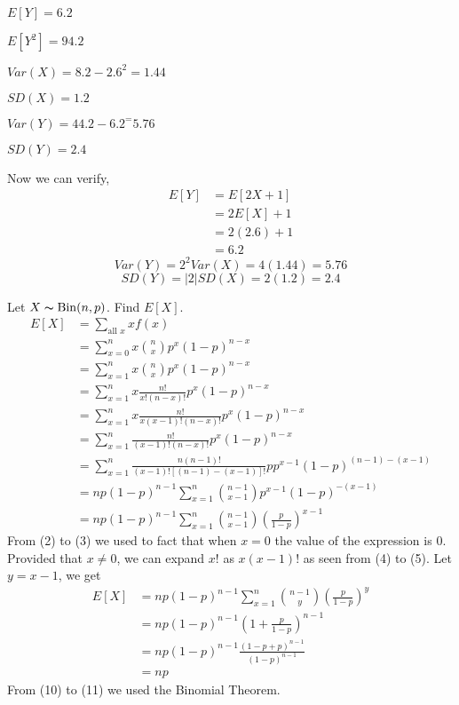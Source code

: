 $ E[Y]=6.2 $

$ E[Y^2]=94.2 $

$ Var(X)=8.2-2.6^2=1.44 $

$ SD(X)=1.2 $

$ Var(Y)=44.2-6.2^=5.76 $

$SD(Y)=2.4$

Now we can verify,
\begin{align*}
    E[Y]&=E[2X+1]\\
    &=2E[X]+1\\
    &=2(2.6)+1\\
    &=6.2
\end{align*}
\[ Var(Y)=2^2 Var(X)=4(1.44)=5.76 \]
\[ SD(Y)=|2|SD(X)=2(1.2)=2.4 \]

Let $ X \thicksim \operatorname{Bin}(n,p) $. Find $ E[X] $.
\setcounter{equation}{0}
\begin{align}
    E[X]&=\sum\limits_{\text{all } x}x f(x)\\
    &=\sum\limits_{x=0}^{n}x \binom{n}{x}p^x(1-p)^{n-x}\\
    &=\sum\limits_{x=1}^{n}x \binom{n}{x}p^x(1-p)^{n-x}\\
    &=\sum\limits_{x=1}^{n}x \frac{n!}{x!(n-x)!}p^x(1-p)^{n-x}\\
    &=\sum\limits_{x=1}^{n}x \frac{n!}{x(x-1)!(n-x)!}p^x(1-p)^{n-x}\\
    &=\sum\limits_{x=1}^{n}\frac{n!}{(x-1)!(n-x)!}p^x(1-p)^{n-x}\\
    &=\sum\limits_{x=1}^{n}\frac{n(n-1)!}{(x-1)![(n-1)-(x-1)]!}pp^{x-1}(1-p)^{(n-1)-(x-1)}\\
    &=np(1-p)^{n-1}\sum\limits_{x=1}^{n}\binom{n-1}{x-1}p^{x-1}(1-p)^{-(x-1)}\\
    &=np(1-p)^{n-1}\sum\limits_{x=1}^{n}\binom{n-1}{x-1}\left(\frac{p}{1-p}\right)^{x-1}
\end{align}
From (2) to (3) we used to fact that when $ x=0 $ the value of the expression 
is $ 0 $. Provided that $ x\neq 0 $, we can expand $ x! $ as $ x(x-1)! $ as
seen from (4) to (5). Let $ y=x-1 $, we get
\begin{align}
    E[X]&=np(1-p)^{n-1}\sum\limits_{x=1}^{n}\binom{n-1}{y}\left(\frac{p}{1-p}\right)^{y}\\
    &=np(1-p)^{n-1}\left(1+\frac{p}{1-p}\right)^{n-1}\\
    &=np(1-p)^{n-1}\frac{(1-p+p)^{n-1}}{(1-p)^{n-1}}\\
    &=np
\end{align}
From (10) to (11) we used the Binomial Theorem.

